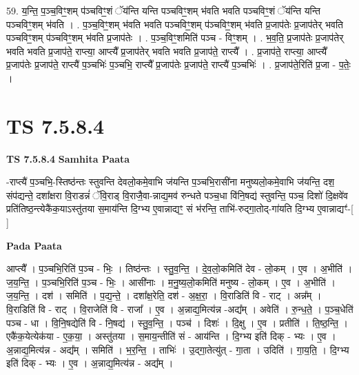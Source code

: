 \documentclass[17pt]{extarticle}
\begin{document}
59. य॒न्ति॒ प॒ञ्च॒विꣳ॒॒शम् प॑ञ्चविꣳ॒॒शं ॅय॑न्ति यन्ति पञ्चविꣳ॒॒शम् भ॑वति भवति पञ्चविꣳ॒॒शं ॅय॑न्ति यन्ति पञ्चविꣳ॒॒शम् भ॑वति । . प॒ञ्च॒विꣳ॒॒शम् भ॑वति भवति पञ्चविꣳ॒॒शम् प॑ञ्चविꣳ॒॒शम् भ॑वति प्र॒जाप॑तेः प्र॒जाप॑तेर् भवति पञ्चविꣳ॒॒शम् प॑ञ्चविꣳ॒॒शम् भ॑वति प्र॒जाप॑तेः । . प॒ञ्च॒विꣳ॒॒शमिति॑ पञ्च - विꣳ॒॒शम् । . भ॒व॒ति॒ प्र॒जाप॑तेः प्र॒जाप॑तेर् भवति भवति प्र॒जाप॑ते॒ राप्त्या॒ आप्त्यै᳚ प्र॒जाप॑तेर् भवति भवति प्र॒जाप॑ते॒ राप्त्यै᳚ । . प्र॒जाप॑ते॒ राप्त्या॒ आप्त्यै᳚ प्र॒जाप॑तेः प्र॒जाप॑ते॒ राप्त्यै॑ प॒ञ्चभिः॑ प॒ञ्चभि॒ राप्त्यै᳚ प्र॒जाप॑तेः प्र॒जाप॑ते॒ राप्त्यै॑ प॒ञ्चभिः॑ । . प्र॒जाप॑ते॒रिति॑ प्र॒जा - प॒तेः॒ । \newline
\pagebreak
{}

\section{ TS 7.5.8.4 }

\textbf{TS 7.5.8.4 } \newline
\textbf{Samhita Paata} \newline

-राप्त्यै॑ प॒ञ्चभि॒-स्तिष्ठ॑न्तः स्तुवन्ति देवलो॒कमे॒वाभि ज॑यन्ति प॒ञ्चभि॒रासी॑ना मनुष्यलो॒कमे॒वाभि ज॑यन्ति॒ दश॒ संप॑द्यन्ते॒ दशा᳚क्षरा वि॒राडन्नं॑ ॅवि॒राड् वि॒राजै॒वा-न्नाद्य॒मव॑ रुन्धते पञ्च॒धा वि॑नि॒षद्य॑ स्तुवन्ति॒ पञ्च॒ दिशो॑ दि॒क्षवे॑व प्रति॑तिष्ठ॒न्त्येकै॑क॒याऽस्तु॑तया स॒माय॑न्ति दि॒ग्भ्य ए॒वान्नाद्यꣳ॒॒ सं भ॑रन्ति॒ ताभि॑-रुद्गा॒तोद्-गा॑यति दि॒ग्भ्य ए॒वान्नाद्यꣳ॑-[  ] \newline

\textbf{Pada Paata} \newline

आप्त्यै᳚ । प॒ञ्चभि॒रिति॑ प॒ञ्च - भिः॒ । तिष्ठ॑न्तः । स्तु॒व॒न्ति॒ । दे॒व॒लो॒कमिति॑ देव - लो॒कम् । ए॒व । अ॒भीति॑ । ज॒य॒न्ति॒ । प॒ञ्चभि॒रिति॑ प॒ञ्च - भिः॒ । आसी॑नाः । म॒नु॒ष्य॒लो॒कमिति॑ मनुष्य - लो॒कम् । ए॒व । अ॒भीति॑ । ज॒य॒न्ति॒ । दश॑ । समिति॑ । प॒द्य॒न्ते॒ । दशा᳚क्ष॒रेति॒ दश॑ - अ॒क्ष॒रा॒ । वि॒राडिति॑ वि - राट् । अन्न᳚म् । वि॒राडिति॑ वि - राट् । वि॒राजेति॑ वि - राजा᳚ । ए॒व । अ॒न्नाद्य॒मित्य॑न्न -अद्य᳚म् । अवेति॑ । रु॒न्ध॒ते॒ । प॒ञ्च॒धेति॑ पञ्च - धा । वि॒नि॒षद्येति॑ वि - नि॒षद्य॑ । स्तु॒व॒न्ति॒ । पञ्च॑ । दिशः॑ । दि॒क्षु । ए॒व । प्रतीति॑ । ति॒ष्ठ॒न्ति॒ । एकै॑क॒येत्येक॑या - ए॒क॒या॒ । अस्तु॑तया । स॒माय॒न्तीति॑ सं - आय॑न्ति । दि॒ग्भ्य इति॑ दिक् - भ्यः । ए॒व । अ॒न्नाद्य॒मित्य॑न्न - अद्य᳚म् । समिति॑ । भ॒र॒न्ति॒ । ताभिः॑ । उ॒द्गा॒तेत्यु॑त् - गा॒ता । उदिति॑ । गा॒य॒ति॒ । दि॒ग्भ्य इति॑ दिक् - भ्यः । ए॒व । अ॒न्नाद्य॒मित्य॑न्न - अद्य᳚म् ।  \newline
\end{document}
